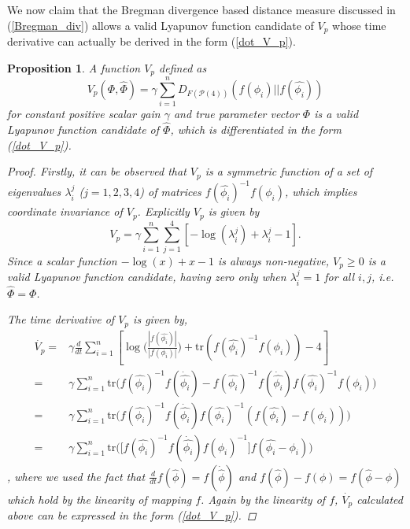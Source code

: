 \documentclass[Afour,sageh,times]{sagej}
\newtheorem{proposition}{Proposition}
\begin{document}
We now claim that the Bregman divergence based distance measure discussed in (\ref{Bregman_div}) allows a valid Lyapunov function candidate of $V_{p}$ whose time derivative can actually be derived in the form (\ref{dot_V_p}).
\begin{proposition}
A function $V_{p}$ defined as
\begin{equation}
V_{p}(\Phi,\hat{\Phi}) = \gamma \sum_{i=1}^n D_{F(\mathcal{P}(4))}(f(\phi_{i}) || f(\hat{\phi_{i}})) \label{bregman_V_p}
\end{equation}
 for constant positive scalar gain $\gamma$ and true parameter vector $\Phi$ is a valid Lyapunov function candidate of $\hat{\Phi}$, which is differentiated in the form (\ref{dot_V_p}).

\begin{proof}
Firstly, it can be observed that $V_{p}$ is a symmetric function of a set of eigenvalues $\lambda_{i}^{j}$ ($j=1,2,3,4$) of matrices $f(\hat{\phi_{i}})^{-1}f(\phi_{i})$, which implies coordinate invariance of $V_{p}$. Explicitly $V_{p}$ is given by
\begin{equation*}
V_{p} = \gamma\sum_{i=1}^{n}\sum_{j=1}^{4}[ - \log(\lambda_{i}^{j}) + \lambda_{i}^{j} - 1].
\end{equation*}
Since a scalar function $-\log(x)+x-1$ is always non-negative, $V_{p}\geq 0$ is a valid Lyapunov function candidate, having zero only when $\lambda_{i}^{j} = 1$ for all $i,j$, i.e. $ \hat{\Phi} = \Phi$.

The time derivative of $V_{p}$ is given by,
\begin{align}
\dot{V_{p}} =&\gamma\frac{d}{dt}\sum_{i=1}^n\left[\log\bigg(\frac{|f(\hat{\phi_{i}})|}{|f(\phi_{i})|}\bigg) + \mathrm{tr}(f(\hat{\phi_{i}})^{-1}f(\phi_{i})) - 4\right] \nonumber\\
=&\gamma\sum_{i=1}^n \mathrm{tr}\bigg(f(\hat{\phi_{i}})^{-1}f(\dot{\hat{\phi_{i}}})-f(\hat{\phi_{i}})^{-1}f(\dot{\hat{\phi_{i}}})f(\hat{\phi_{i}})^{-1}f(\phi_{i})\bigg)\nonumber\\
=& \gamma\sum_{i=1}^n \mathrm{tr}\bigg(f(\hat{\phi_{i}})^{-1}f(\dot{\hat{\phi_{i}}})f(\hat{\phi_{i}})^{-1}(f(\hat{\phi_{i}})-f(\phi_{i}))\bigg)\nonumber\\
=&\gamma\sum_{i=1}^n \mathrm{tr}\bigg(\big[f(\hat{\phi_{i}})^{-1}f(\dot{\hat{\phi_{i}}})f(\hat{\phi_{i}})^{-1}\big]f(\hat{\phi_{i}}-\phi_{i})\bigg)\label{dot_V_p_bregman}
\end{align}
, where we used the fact that $\frac{d}{dt}f(\hat{\phi})=f(\dot{\hat{\phi}})$ and $f(\hat{\phi})-f(\phi) = f(\hat{\phi}-\phi)$ which hold by the linearity of mapping $f$. Again by the linearity of $f$, $\dot{V_{p}}$ calculated above can be expressed in the form (\ref{dot_V_p}).
\end{proof}
\end{proposition}
\end{document}
